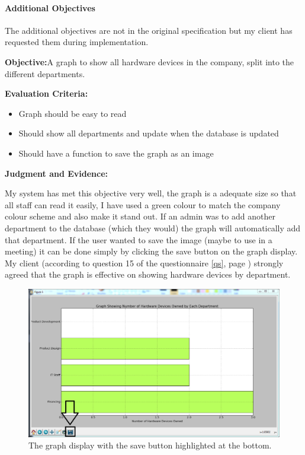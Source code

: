 \paragraph{Additional Objectives}

The additional objectives are not in the original specification but my client has requested them during implementation.

\textbf{Objective:}A graph to show all hardware devices in the company, split into the different departments.

\textbf{Evaluation Criteria:}
\begin{itemize}
\item{Graph should be easy to read}
\item{Should show all departments and update when the database is updated}
\item{Should have a function to save the graph as an image}
\end{itemize}

\textbf{Judgment and Evidence:}

My system has met this objective very well, the graph is a adequate size so that all staff can read it easily, I have used a green colour to match the company colour scheme and also make it stand out. If an admin was to add another department to the database (which they would) the graph will automatically add that department. If the user wanted to save the image (maybe to use in a meeting) it can be done simply by clicking the save button on the graph display. My client (according to question 15 of the questionnaire \ref{qs}, page \pageref{qs}) strongly agreed that the graph is effective on showing hardware devices by department.

\begin{figure}[H]
    \includegraphics[width=\textwidth]{./Manual/Images/graph2.png}
    \caption{The graph display with the save button highlighted at the bottom.} 
\end{figure}

